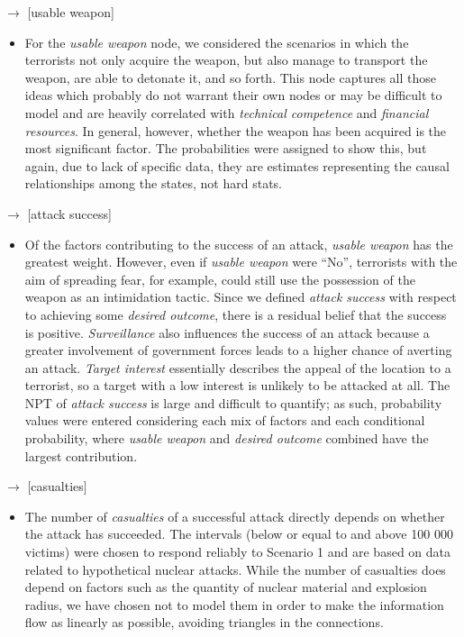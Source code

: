 \documentclass{article}
\begin{document}
{ $\longrightarrow$ [usable weapon] 
\begin{itemize}
    \item   For the \textit{usable weapon} node, we considered the scenarios in which the terrorists not only acquire the weapon, but also manage to transport the weapon, are able to detonate it, and so forth. This node captures all those ideas which probably do not warrant their own nodes or may be difficult to model and are heavily correlated with \textit{technical competence} and \textit{financial resources}. In general, however, whether the weapon has been acquired is the most significant factor. The probabilities were assigned to show this, but again, due to lack of specific data, they are estimates representing the causal relationships among the states, not hard stats.  
\end{itemize}

 $\longrightarrow$ [attack success]
\begin{itemize}
    \item     Of the factors contributing to the success of an attack, \textit{usable weapon} has the greatest weight. However, even if \textit{usable weapon} were “No”, terrorists with the aim of spreading fear, for example, could still use the possession of the weapon as an intimidation tactic. Since we defined \textit{attack success} with respect to achieving some \textit{desired outcome}, there is a residual belief that the success is positive. \textit{Surveillance} also influences the success of an attack because a greater involvement of government forces leads to a higher chance of averting an attack. \textit{Target interest} essentially describes the appeal of the location to a terrorist, so a target with a low interest is unlikely to be attacked at all. The NPT of \textit{attack success} is large and difficult to quantify; as such, probability values were entered considering each mix of factors and each conditional probability, where \textit{usable weapon} and \textit{desired outcome} combined have the largest contribution. 
\end{itemize}

 $\longrightarrow$ [casualties] 
\begin{itemize}
    \item     The number of \textit{casualties} of a successful attack directly depends on whether the attack has succeeded. The intervals (below or equal to and above 100 000 victims) were chosen to respond reliably to Scenario 1 and are based on data related to hypothetical nuclear attacks\cite{ListProjectedDeath2020}. While the number of casualties does depend on factors such as the quantity of nuclear material and explosion radius, we have chosen not to model them in order to make the information flow as linearly as possible, avoiding triangles in the connections.
\end{itemize}

}
\end{document}
